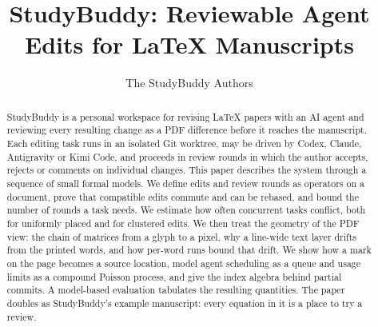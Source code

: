 \documentclass[11pt]{article}
\title{StudyBuddy: Reviewable Agent Edits for \LaTeX{} Manuscripts}
\author{The StudyBuddy Authors}
\date{}
\begin{document}
\maketitle

\begin{abstract}
StudyBuddy is a personal workspace for revising \LaTeX{} papers with an AI agent
and reviewing every resulting change as a PDF difference before it reaches the
manuscript. Each editing task runs in an isolated Git worktree, may be driven
by Codex, Claude, Antigravity or Kimi Code, and proceeds in review rounds in which the
author accepts, rejects or comments on individual changes. This paper describes
the system through a sequence of small formal models. We define edits and
review rounds as operators on a document, prove that compatible edits commute
and can be rebased, and bound the number of rounds a task needs. We estimate
how often concurrent tasks conflict, both for uniformly placed and for
clustered edits. We then treat the geometry of the PDF view: the chain of
matrices from a glyph to a pixel, why a line-wide text layer drifts from the
printed words, and how per-word runs bound that drift. We show how a mark on
the page becomes a source location, model agent scheduling as a queue and
usage limits as a compound Poisson process, and give the index algebra behind
partial commits. A model-based evaluation tabulates the resulting quantities.
The paper doubles as StudyBuddy's example manuscript: every equation in it is a
place to try a review.
\end{abstract}

\tableofcontents
\clearpage

















\appendix





\end{document}
